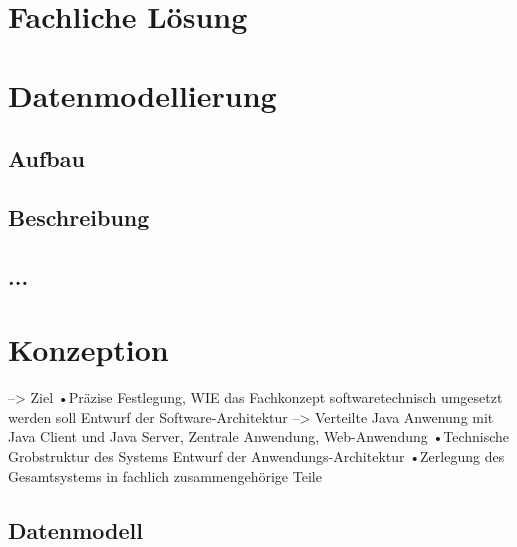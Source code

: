 \documentclass[12pt, titlepage]{article}
\begin{document}


\doublespacing














\section{Fachliche Lösung}

\newpage
\section{Datenmodellierung}
\subsection{Aufbau}
\subsection{Beschreibung }
\subsection{...}

\newpage
\section{Konzeption}

--> Ziel
•Präzise Festlegung, WIE das Fachkonzept softwaretechnisch umgesetzt werden soll
Entwurf der Software-Architektur
--> Verteilte Java Anwenung mit Java Client und Java Server, Zentrale Anwendung, Web-Anwendung
•Technische Grobstruktur des Systems
Entwurf der Anwendungs-Architektur
•Zerlegung des Gesamtsystems in fachlich zusammengehörige Teile

\subsection{Datenmodell}
\end{document}
